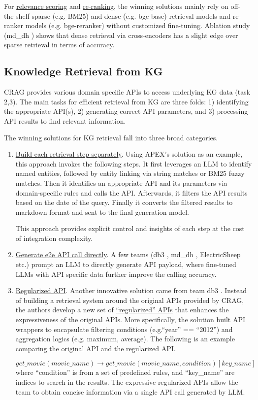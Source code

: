 For \underline{relevance scoring} and \underline{re-ranking}, the winning solutions mainly rely on off-the-shelf sparse (e.g. BM25) and dense (e.g. bge-base) retrieval models and re-ranker models (e.g. bge-reranker) without customized fine-tuning. Ablation study (md\_dh \cite{mddh}) shows that dense retrieval via cross-encoders has a slight edge over sparse retrieval in terms of accuracy. 

\subsection{Knowledge Retrieval from KG} \label{sec: kg}
CRAG provides various domain specific APIs to access underlying KG data (task 2,3). The main tasks for efficient retrieval from KG are three folds: 1) identifying the appropriate API(s), 2) generating correct API parameters, and 3) processing API results to find relevant information. 

The winning solutions for KG retrieval fall into three broad categories.
\begin{enumerate}
    \item \underline{Build each retrieval step separately}. Using APEX’s \cite{apex} solution as an example, this approach invokes the following steps. It first leverages an LLM to identify named entities, followed by entity linking via string matches or BM25 fuzzy matches. Then it identifies an appropriate API and its parameters via domain-specific rules and calls the API. Afterwards, it filters the API results based on the date of the query. Finally it converts the filtered results to markdown format and sent to the final generation model. 
    
    This approach provides explicit control and insights of each step at the cost of integration complexity.
    \item \underline{Generate e2e API call directly}. A few teams (db3 \cite{db3}, md\_dh \cite{mddh}, ElectricSheep \cite{electricsheep} etc.) prompt an LLM to directly generate API payload, where fine-tuned LLMs with API specific data further improve the calling accuracy.
    \item \underline{Regularized API}. Another innovative solution came from team db3 \cite{db3}. Instead of building a retrieval system around the original APIs provided by CRAG, the authors develop a new set of \underline{“regularized” APIs} that enhances the expressiveness of the original APIs. More specifically, the solution built API wrappers to encapsulate filtering conditions (e.g.``year” == “2012”) and aggregation logics (e.g. maximum, average). The following is an example comparing the original API and the regularized API.

\begin{equation}
    get\_movie(movie\_name) \rightarrow get\_movie(movie\_name, condition)[key\_name]
\end{equation}
where “condition” is from a set of predefined rules, and “key\_name” are indices to search in the results. The expressive regularized APIs allow the team to obtain concise information via a single API call generated by LLM.
\end{enumerate}

